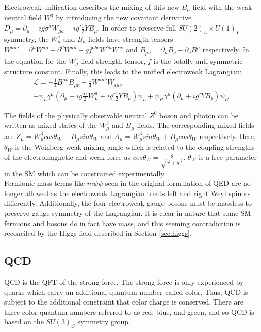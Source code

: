 Electroweak unification describes the mixing of this new $B_{\mu}$ field with the weak neutral field $W^3$ by introducing the new covariant derivative $D_{\mu}=\partial_{\mu}-ig\sigma^a W_{\mu a}+ig'\frac{1}{2}YB_{\mu}$. In order to preserve full $SU(2)_L\times U(1)_Y$ symmetry, the $W_{\mu}^a$ and $B_{\mu}$ fields have strength tensors $W^{a\mu\nu}=\partial^{\mu}W^{a\mu}-\partial^{\nu}W^{a\mu}+gf^{abc}W^{b\mu}W^{c\nu}$ and $B_{\mu\nu}=\partial_{\mu}B_{\nu}-\partial_{\nu}B^{\mu}$ respectively. In the equation for the $W_{\mu}^a$ field strength tensor, $f$ is the totally anti-symmetric structure constant. Finally, this leads to the unified electroweak Lagrangian:
\begin{multline}\nonumber
\mathcal{L}=-\frac{1}{4}B^{\mu\nu}B_{\mu\nu} - \frac{1}{4}W^{a\mu\nu}W_{a\mu\nu} \\ + \bar{\psi}_L\gamma^{\mu}(\partial_{\mu}-ig\frac{\sigma^a}{2}W_{\mu}^a+ig'\frac{1}{2}YB_{\mu})\psi_L + \bar{\psi}_R\gamma^{\mu}(\partial_{\mu}+ig'YB_{\mu})\psi_R.
\end{multline}

The fields of the physically observable neutral $Z^0$ boson and photon can be written as mixed states of the $W_{\mu}^3$ and $B_{\mu}$ fields. The corresponding mixed fields are  $Z_{\mu}=W_{\mu}^3cos\theta_W - B_{\mu}sin\theta_W$ and $A_{\mu}=W_{\mu}^3sin\theta_W + B_{\mu}cos\theta_W$ respectively. Here, $\theta_W$ is the Weinberg weak mixing angle which is related to the coupling strengths of the electromagnetic and weak force as $cos\theta_W=\frac{g}{\sqrt{g^2+g'^2}}$. $\theta_W$ is a free parameter in the SM which can be constrained experimentally.\\

Fermionic mass terms like $m\bar{\psi}\psi$ seen in the original formulation of QED are no longer allowed as the electroweak Lagrangian treats left and right Weyl spinors differently. Additionally, the four electroweak gauge bosons must be massless to preserve gauge symmetry of the Lagrangian. It is clear in nature that some SM fermions and bosons do in fact have mass, and this seeming contradiction is reconciled by the Higgs field described in Section \ref{sec:higgs}.

\subsection{QCD}\label{qcd}
QCD is the QFT of the strong force. The strong force is only experienced by quarks which carry an additional quantum number called color. Thus, QCD is subject to the additional constraint that color charge is conserved. There are three color quantum numbers referred to as red, blue, and green, and so QCD is based on the $SU(3)_C$ symmetry group.\\

